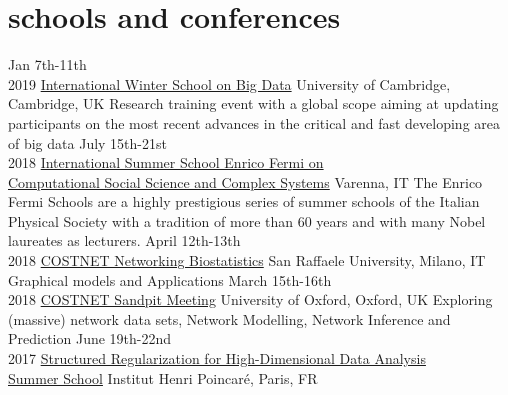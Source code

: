\documentclass[]{cv-style}     %
\begin{document}
\section{schools and conferences}
\begin{entrylist}
\entry
{Jan 7th-11th\\2019}
{\href{http://bigdat2019.irdta.eu/}{International Winter School on Big Data}}
{University of Cambridge, Cambridge, UK}
{Research training event with a global scope aiming at updating participants on the most recent advances in the critical and fast developing area of big data}
\entry
{July 15th-21st\\2018}
{\href{https://sites.google.com/view/varennacs2018}{International Summer School Enrico Fermi on\\Computational Social Science and Complex Systems}}
{Varenna, IT}
{The Enrico Fermi Schools are a highly prestigious series of summer schools of the Italian Physical Society with a tradition of more than 60 years and with many Nobel laureates as lecturers.}
\entry
{April 12th-13th\\2018}
{\href{http://ibs-italy.org/?page_id=703&lang=en}{COSTNET Networking Biostatistics}}
{San Raffaele University, Milano, IT}
{Graphical models and Applications}
\entry
{March 15th-16th\\2018}
{\href{https://www.oxforduniversitystores.co.uk/conferences-events/statistics/statistics/costnet-sandpit-meeting}{COSTNET Sandpit Meeting}}
{University of Oxford, Oxford, UK}
{Exploring (massive) network data sets, Network Modelling, Network Inference and Prediction}
\entry
{June 19th-22nd\\2017}
{\href{https://regularize-in-paris.github.io/}{Structured Regularization for High-Dimensional Data Analysis\\Summer School}}
{Institut Henri Poincaré, Paris, FR}
{}
\end{entrylist}

\end{document}
